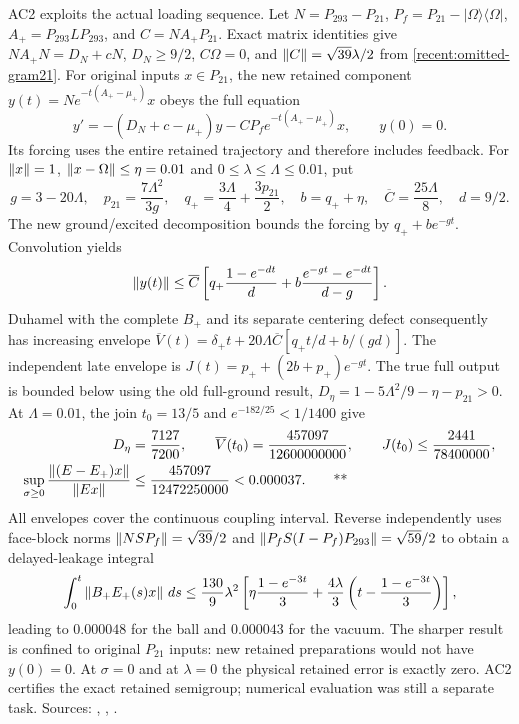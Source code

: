 AC2 exploits the actual loading sequence.  Let $N=P_{293}-P_{21}$,
$P_f=P_{21}-|\Omega\rangle\langle\Omega|$, $A_+=P_{293}LP_{293}$, and
$C=NA_+P_{21}$.  Exact matrix identities give
$NA_+N=D_N+cN$, $D_N\ge9/2$, $C\Omega=0$, and
$\left\lVert C\right\rVert=\sqrt{39}\lambda/2$ from \eqref{recent:omitted-gram21}.
For original inputs $x\in P_{21}$, the new retained component
$y(t)=Ne^{-t(A_+-\mu_+)}x$ obeys the full equation
\begin{equation}
 y'=-(D_N+c-\mu_+)y-CP_fe^{-t(A_+-\mu_+)}x,\qquad y(0)=0.
 \label{recent:loading-equation}
\end{equation}
Its forcing uses the entire retained trajectory and therefore includes feedback.
For $\left\lVert x\right\rVert=1$, $\left\lVert x-\Omega\right\rVert\le\eta=0.01$ and
$0\le\lambda\le\Lambda\le0.01$, put
\begin{equation}
 g=3-20\Lambda,\quad p_{21}=\frac{7\Lambda^2}{3g},\quad
 q_+=\frac{3\Lambda}{4}+\frac{3p_{21}}2,\quad b=q_++\eta,
 \quad\overline C=\frac{25\Lambda}{8},\quad d=9/2.
 \label{recent:loading-envelopes}
\end{equation}
The new ground/excited decomposition bounds the forcing by
$q_++be^{-gt}$.  Convolution yields
\begin{equation}
 \left\lVert y(t)\right\rVert\le\overline C\left[
 q_+\frac{1-e^{-dt}}d+b\frac{e^{-gt}-e^{-dt}}{d-g}\right].
 \label{recent:delayed-loading}
\end{equation}
Duhamel with the complete $B_+$ and its separate centering defect consequently
has increasing envelope
$\overline V(t)=\delta_+t+20\Lambda\overline C[q_+t/d+b/(gd)]$.
The independent late envelope is
$J(t)=p_++(2b+p_+)e^{-gt}$.  The true full output is bounded below using the old
full-ground result,
$D_\eta=1-5\Lambda^2/9-\eta-p_{21}>0$.
At $\Lambda=0.01$, the join $t_0=13/5$ and $e^{-182/25}<1/1400$ give
\begin{equation}
 \begin{aligned}
 D_\eta&=\frac{7127}{7200},\qquad
 \overline V(t_0)=\frac{457097}{12600000000},\qquad
 J(t_0)\le\frac{2441}{78400000},\\
 \sup_{\sigma\ge0}\frac{\left\lVert (E-E_+)x\right\rVert}{\left\lVert Ex\right\rVert}
 &\le\frac{457097}{12472250000}<0.000037.\qquad\text{**}
 \end{aligned}
 \label{recent:ac-relative}
\end{equation}
All envelopes cover the continuous coupling interval.  Reverse independently
uses face-block norms $\left\lVert NSP_f\right\rVert=\sqrt{39}/2$ and
$\left\lVert P_fS(I-P_f)P_{293}\right\rVert=\sqrt{59}/2$ to obtain a delayed-leakage integral
\begin{equation}
 \int_0^t\left\lVert B_+E_+(s)x\right\rVert\,ds\le\frac{130}{9}\lambda^2
 \left[\eta\frac{1-e^{-3t}}3+\frac{4\lambda}{3}
 \left(t-\frac{1-e^{-3t}}3\right)\right],
 \label{recent:reverse-loading}
\end{equation}
leading to $0.000048$ for the ball and $0.000043$ for the vacuum.
The sharper result is confined to original $P_{21}$ inputs: new retained
preparations would not have $y(0)=0$.  At $\sigma=0$ and at $\lambda=0$ the
physical retained error is exactly zero.  AC2 certifies the exact retained
semigroup; numerical evaluation was still a separate task.
Sources: ,
,
.

